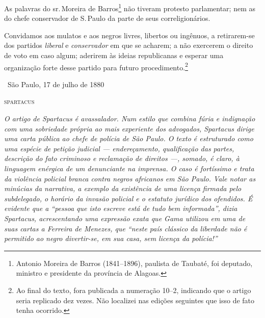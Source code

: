 As palavras do sr.\,Moreira de Barros\footnote{Antonio Moreira de
  Barros (1841--1896), paulista de Taubaté, foi deputado, ministro e
  presidente da província de Alagoas.} não tiveram protesto parlamentar;
nem as do chefe conservador de S.\,Paulo da parte de seus
correligionários.

Convidamos aos mulatos e aos negros livres, libertos ou ingênuos, a
retirarem-se dos partidos \emph{liberal} e \emph{conservador} em que se
acharem; a não exercerem o direito de voto em caso algum; aderirem às
ideias republicanas e esperar uma organização forte desse partido para
futuro procedimento.\footnote{Ao final do texto, fora publicada a numeração 10--2, indicando que o artigo seria replicado dez vezes. Não localizei nas edições seguintes que isso de
  fato tenha ocorrido.}\medskip

\hfill\ São Paulo, 17 de julho de 1880

\hfill\textsc{spartacus}


\begin{resumo}
\emph{O artigo de Spartacus é avassalador. Num estilo que combina
fúria e indignação com uma sobriedade própria ao mais experiente dos
advogados, Spartacus dirige uma carta pública ao chefe de polícia
de São Paulo. O texto é estruturado como uma espécie de petição judicial
--- endereçamento, qualificação das partes, descrição do fato criminoso e
reclamação de direitos ---, somado, é claro, à linguagem enérgica de um
denunciante na imprensa. O caso é fortíssimo e trata da violência
policial branca contra negros africanos em São Paulo. Vale notar as
minúcias da narrativa, a exemplo da existência de uma licença firmada
pelo subdelegado, o horário da invasão policial e o estatuto jurídico
dos ofendidos. É evidente que a ``pessoa que isto escreve está de tudo
bem informada'', dizia Spartacus, acrescentando uma expressão
exata que Gama utilizou em uma de suas cartas a Ferreira de Menezes, que
``neste país clássico da liberdade não é permitido ao negro divertir-se,
em sua casa, sem licença da polícia!'' }
\end{resumo}



